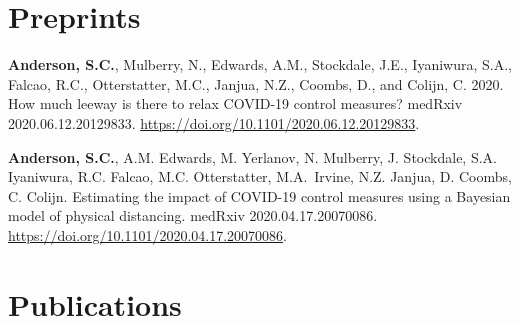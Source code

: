 \hypertarget{preprints}{%
\section{Preprints}\label{preprints}}

\begin{description}
\tightlist
\item[2020]
\textbf{Anderson, S.C.}, Mulberry, N., Edwards, A.M., Stockdale, J.E.,
Iyaniwura, S.A., Falcao, R.C., Otterstatter, M.C., Janjua, N.Z., Coombs,
D., and Colijn, C. 2020. How much leeway is there to relax COVID-19
control measures? medRxiv 2020.06.12.20129833.
\url{https://doi.org/10.1101/2020.06.12.20129833}.
\item[2020]
\textbf{Anderson, S.C.}, A.M. Edwards, M. Yerlanov, N. Mulberry, J.
Stockdale, S.A. Iyaniwura, R.C. Falcao, M.C. Otterstatter, M.A.\ Irvine,
N.Z. Janjua, D. Coombs, C. Colijn. Estimating the impact of COVID-19
control measures using a Bayesian model of physical distancing. medRxiv
2020.04.17.20070086. \url{https://doi.org/10.1101/2020.04.17.20070086}.
\end{description}

\hypertarget{publications}{%
\section{Publications}\label{publications}}

